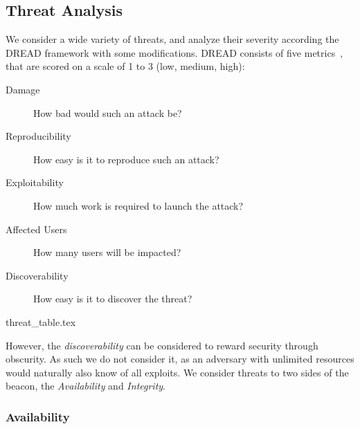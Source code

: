 \subsection{Threat Analysis}
We consider a wide variety of threats, and analyze their severity according the DREAD framework with some modifications. DREAD consists of five metrics~\cite{dread}, that are scored on a scale of 1 to 3 (low, medium, high):
\begin{description}
    \item [Damage] How bad would such an attack be?
    \item [Reproducibility] How easy is it to reproduce such an attack?
    \item [Exploitability] How much work is required to launch the attack?
    \item [Affected Users] How many users will be impacted?
    \item [Discoverability] How easy is it to discover the threat?
\end{description}

{threat_table.tex}

However, the \emph{discoverability} can be considered to reward security through obscurity. As such we do not consider it, as an adversary with unlimited resources would naturally also know of all exploits.
We consider threats to two sides of the beacon, the \emph{Availability} and \emph{Integrity}.

\subsubsection{Availability}

\newcommand{\parathreat}[1]{\paragraph{#1}\hspace{-1ex}}

